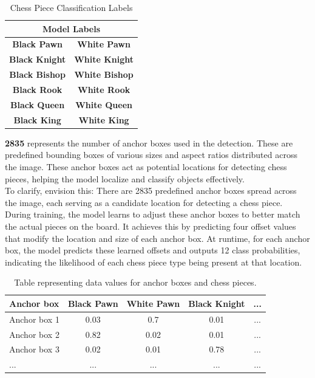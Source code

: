 \begin{table}[ht]
\centering
\caption{Chess Piece Classification Labels}
\begin{tabular}{|c|c|}
\hline
\multicolumn{2}{|c|}{\textbf{Model Labels}} \\  %
\hline
\textbf{Black Pawn} & \textbf{White Pawn} \\
\textbf{Black Knight} & \textbf{White Knight} \\
\textbf{Black Bishop} & \textbf{White Bishop} \\
\textbf{Black Rook} & \textbf{White Rook} \\
\textbf{Black Queen} & \textbf{White Queen} \\
\textbf{Black King} & \textbf{White King} \\
\hline
\end{tabular}
\end{table}


\textbf{2835} represents the number of anchor boxes used in the detection. These are predefined bounding boxes of various sizes and aspect ratios distributed across the image. These anchor boxes act as potential locations for detecting chess pieces, helping the model localize and classify objects effectively. \\

To clarify, envision this: There are 2835 predefined anchor boxes spread across the image, each serving as a candidate location for detecting a chess piece. During training, the model learns to adjust these anchor boxes to better match the actual pieces on the board. It achieves this by predicting four offset values that modify the location and size of each anchor box. At runtime, for each anchor box, the model predicts these learned offsets and outputs 12 class probabilities, indicating the likelihood of each chess piece type being present at that location.

\newpage

\begin{table}[h]
    \centering
    \begin{tabular}{lcccc}
        \toprule
        \textbf{Anchor box} & \textbf{Black Pawn} & \textbf{White Pawn} & \textbf{Black Knight} & \textbf{...} \\
        \midrule
        Anchor box 1 & 0.03 & 0.7 & 0.01 & ... \\
        Anchor box 2 & 0.82 & 0.02 & 0.01 & ... \\
        Anchor box 3 & 0.02 & 0.01 & 0.78 & ... \\
        ... & ... & ... & ... & ... \\
        \bottomrule
    \end{tabular}
    \caption{Table representing data values for anchor boxes and chess pieces.}
    \label{tab:example-table}
\end{table}

